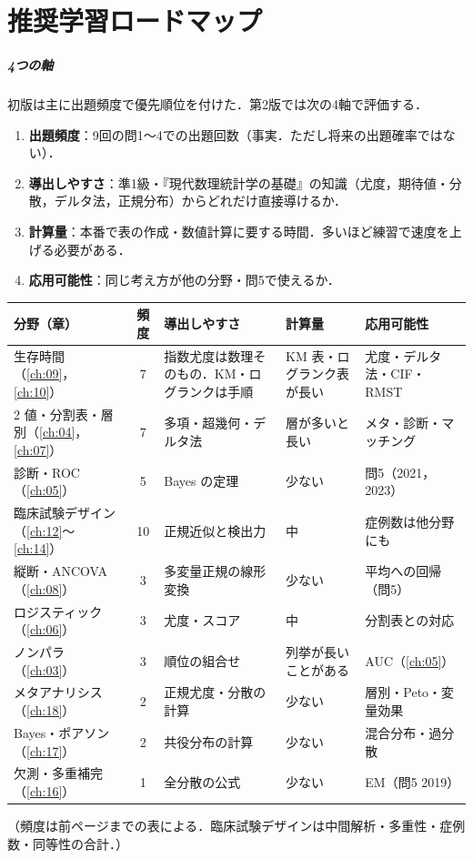 \chapter*{推奨学習ロードマップ}

\paragraph{4つの軸}
初版は主に出題頻度で優先順位を付けた．第2版では次の4軸で評価する．
\begin{enumerate}[label=(\arabic*)]
\item \textbf{出題頻度}：9回の問1〜4での出題回数（事実．ただし将来の出題確率ではない）．
\item \textbf{導出しやすさ}：準1級・『現代数理統計学の基礎』の知識（尤度，期待値・分散，デルタ法，正規分布）からどれだけ直接導けるか．
\item \textbf{計算量}：本番で表の作成・数値計算に要する時間．多いほど練習で速度を上げる必要がある．
\item \textbf{応用可能性}：同じ考え方が他の分野・問5で使えるか．
\end{enumerate}
\begin{center}\small
\setlength{\tabcolsep}{3pt}
\begin{tabular}{@{}L{44mm}cL{30mm}L{30mm}L{35mm}@{}}
\toprule
分野（章） & 頻度 & 導出しやすさ & 計算量 & 応用可能性\\
\midrule
生存時間（\ref{ch:09}，\ref{ch:10}） & 7 & 指数尤度は数理そのもの．KM・ログランクは手順 & KM 表・ログランク表が長い & 尤度・デルタ法・CIF・RMST\\
2 値・分割表・層別（\ref{ch:04}，\ref{ch:07}） & 7 & 多項・超幾何・デルタ法 & 層が多いと長い & メタ・診断・マッチング\\
診断・ROC（\ref{ch:05}） & 5 & Bayes の定理 & 少ない & 問5（2021，2023）\\
臨床試験デザイン（\ref{ch:12}〜\ref{ch:14}） & 10 & 正規近似と検出力 & 中 & 症例数は他分野にも\\
縦断・ANCOVA（\ref{ch:08}） & 3 & 多変量正規の線形変換 & 少ない & 平均への回帰（問5）\\
ロジスティック（\ref{ch:06}） & 3 & 尤度・スコア & 中 & 分割表との対応\\
ノンパラ（\ref{ch:03}） & 3 & 順位の組合せ & 列挙が長いことがある & AUC（\ref{ch:05}）\\
メタアナリシス（\ref{ch:18}） & 2 & 正規尤度・分散の計算 & 少ない & 層別・Peto・変量効果\\
Bayes・ポアソン（\ref{ch:17}） & 2 & 共役分布の計算 & 少ない & 混合分布・過分散\\
欠測・多重補完（\ref{ch:16}） & 1 & 全分散の公式 & 少ない & EM（問5 2019）\\
\bottomrule
\end{tabular}
\end{center}
（頻度は前ページまでの表による．臨床試験デザインは中間解析・多重性・症例数・同等性の合計．）

